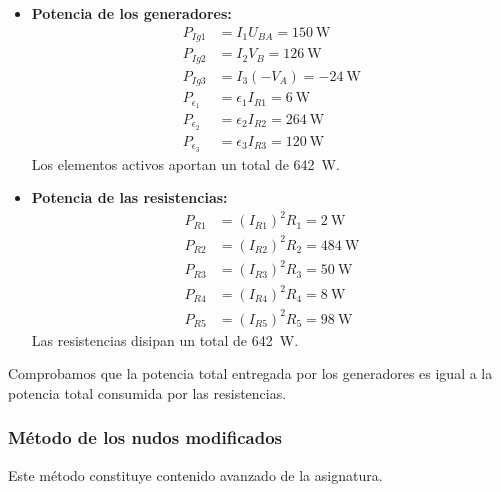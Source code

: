\begin{example}
\begin{itemize}
\item \textbf{Potencia de los generadores:}
  \begin{align*}
    P_{Ig1} &= I_1 U_{BA} = \qty{150}{\watt}\\
    P_{Ig2} &= I_2 V_{B} = \qty{126}{\watt}\\
    P_{Ig3} &= I_3 (-V_{A}) = - \qty{24}{\watt}\\
    P_{\epsilon_1} &= \epsilon_1 I_{R1} = \qty{6}{\watt}\\
    P_{\epsilon_2} &= \epsilon_2 I_{R2} = \qty{264}{\watt}\\
    P_{\epsilon_3} &= \epsilon_3 I_{R3} = \qty{120}{\watt}
  \end{align*}
  Los elementos activos aportan un total de \qty{642}{\watt}.
\item \textbf{Potencia de las resistencias:}
  \begin{align*}
    P_{R1} &= (I_{R1})^2 R_1 = \qty{2}{\watt}\\
    P_{R2} &= (I_{R2})^2 R_2 = \qty{484}{\watt}\\
    P_{R3} &= (I_{R3})^2 R_3 = \qty{50}{\watt}\\
    P_{R4} &= (I_{R4})^2 R_4 = \qty{8}{\watt}\\
    P_{R5} &= (I_{R5})^2 R_5 = \qty{98}{\watt}
  \end{align*}
  Las resistencias disipan un total de \SI{642}{\watt}.
\end{itemize}

Comprobamos que la potencia total entregada por los generadores es igual a la potencia total consumida por las resistencias.

\end{example}
	
\subsubsection{Método de los nudos
  modificados}\label{sec.nudos_modificados}
	
	\begin{remark}
          Este método constituye contenido avanzado de la asignatura.
	\end{remark}
	

